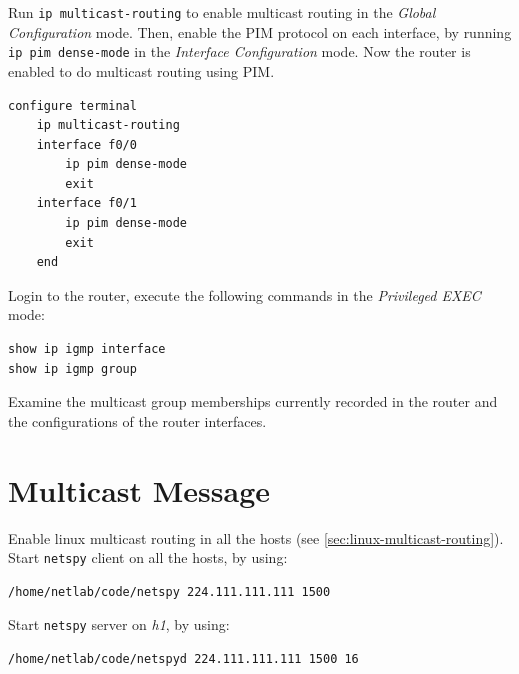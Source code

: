 \documentclass{../UTNetLab}
\begin{document}
Run \lstinline{ip multicast-routing} to enable multicast routing in the \textit{Global Configuration} mode.
Then, enable the PIM protocol on each interface, by running \lstinline{ip pim dense-mode} in the \textit{Interface Configuration} mode.
Now the router is enabled to do multicast routing using PIM.

\begin{lstlisting}[language=cisco]
configure terminal
    ip multicast-routing
    interface f0/0
        ip pim dense-mode
        exit
    interface f0/1
        ip pim dense-mode
        exit
    end
    \end{lstlisting}

Login to the router, execute the following commands in the \textit{Privileged EXEC} mode:

\begin{lstlisting}[language=cisco]
show ip igmp interface
show ip igmp group
    \end{lstlisting}

\begin{report}
    \item Examine the multicast group memberships currently recorded in the router and the configurations of the router interfaces.
\end{report}

\section{Multicast Message}
Enable linux multicast routing in all the hosts (see \autoref{sec:linux-multicast-routing}).\\
Start \lstinline{netspy} client on all the hosts, by using:

\begin{lstlisting}
/home/netlab/code/netspy 224.111.111.111 1500
    \end{lstlisting}
Start \lstinline{netspy} server on \textit{h1}, by using:

\begin{lstlisting}
/home/netlab/code/netspyd 224.111.111.111 1500 16
    \end{lstlisting}
\end{document}
